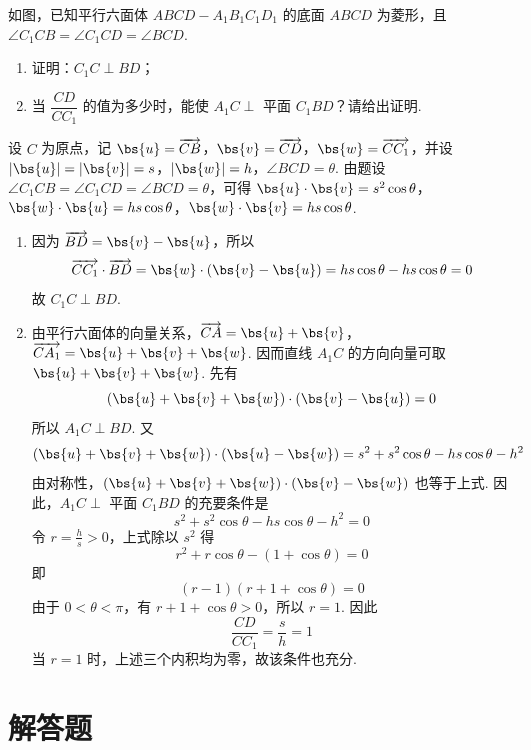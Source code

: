 \reuseproblemnumber
\begin{problem}[乙]
如图，已知平行六面体 \(ABCD - A_{1}B_{1}C_{1}D_{1}\) 的底面 \(ABCD\) 为菱形，且 \(\angle C_{1}CB = \angle C_{1}CD = \angle BCD\).

\begin{enumerate}
\item 证明：\(C_{1}C \perp BD\)；
\item 当 \(\dfrac{CD}{CC_{1}}\) 的值为多少时，能使 \(A_{1}C \perp\) 平面 \(C_{1}BD\)？请给出证明.
\end{enumerate}

\end{problem}

\begin{solution}
设 \(C\) 为原点，记 \(\bs{u}=\overrightarrow{CB}\)，\(\bs{v}=\overrightarrow{CD}\)，\(\bs{w}=\overrightarrow{CC_{1}}\)，并设 \(|\bs{u}|=|\bs{v}|=s\)，\(|\bs{w}|=h\)，\(\angle BCD=\theta\).
由题设 \(\angle C_{1}CB=\angle C_{1}CD=\angle BCD=\theta\)，可得 \(\bs{u}\cdot\bs{v}=s^{2}\cos\theta\)，\(\bs{w}\cdot\bs{u}=hs\cos\theta\)，\(\bs{w}\cdot\bs{v}=hs\cos\theta\).

\begin{enumerate}
\item 因为 \(\overrightarrow{BD}=\bs{v}-\bs{u}\)，所以
\[
\overrightarrow{CC_{1}}\cdot\overrightarrow{BD}=\bs{w}\cdot(\bs{v}-\bs{u})=hs\cos\theta-hs\cos\theta=0
\]
故 \(C_{1}C\perp BD\).
\item 由平行六面体的向量关系，\(\overrightarrow{CA}=\bs{u}+\bs{v}\)，\(\overrightarrow{CA_{1}}=\bs{u}+\bs{v}+\bs{w}\). 因而直线 \(A_{1}C\) 的方向向量可取 \(\bs{u}+\bs{v}+\bs{w}\). 先有
\[
(\bs{u}+\bs{v}+\bs{w})\cdot(\bs{v}-\bs{u})=0
\]
所以 \(A_{1}C\perp BD\). 又
\[
(\bs{u}+\bs{v}+\bs{w})\cdot(\bs{u}-\bs{w})=s^{2}+s^{2}\cos\theta-hs\cos\theta-h^{2}
\]
由对称性，\((\bs{u}+\bs{v}+\bs{w})\cdot(\bs{v}-\bs{w})\) 也等于上式. 因此，\(A_{1}C\perp\) 平面 \(C_{1}BD\) 的充要条件是
\[
s^{2}+s^{2}\cos\theta-hs\cos\theta-h^{2}=0
\]
令 \(r=\frac{h}{s}>0\)，上式除以 \(s^{2}\) 得
\[
r^{2}+r\cos\theta-(1+\cos\theta)=0
\]
即
\[
(r-1)(r+1+\cos\theta)=0
\]
由于 \(0<\theta<\pi\)，有 \(r+1+\cos\theta>0\)，所以 \(r=1\). 因此
\[
\frac{CD}{CC_{1}}=\frac{s}{h}=1
\]
当 \(r=1\) 时，上述三个内积均为零，故该条件也充分.
\end{enumerate}
\end{solution}

\section{解答题}


